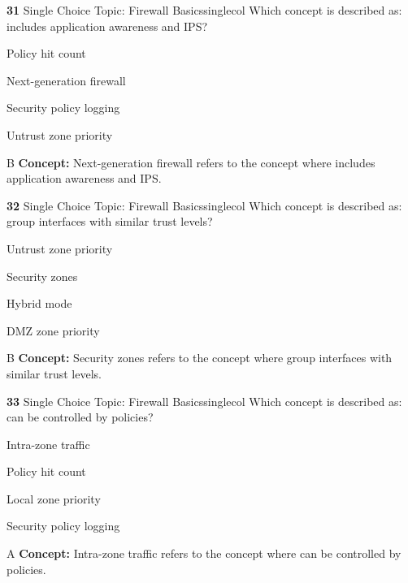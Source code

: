 \documentclass[10pt,a4paper]{article}
\begin{document}
\begin{qcard}{\color{white}\textbf{31} \hfill \small Single Choice \textbar{} Topic: Firewall Basics}{singlecol}
Which concept is described as: includes application awareness and IPS?

\begin{qoptions}
\item Policy hit count
\item Next-generation firewall
\item Security policy logging
\item Untrust zone priority
\end{qoptions}
\begin{explainbox}{B}
\textbf{Concept:} Next-generation firewall refers to the concept where includes application awareness and IPS.
\end{explainbox}
\end{qcard}

\begin{qcard}{\color{white}\textbf{32} \hfill \small Single Choice \textbar{} Topic: Firewall Basics}{singlecol}
Which concept is described as: group interfaces with similar trust levels?

\begin{qoptions}
\item Untrust zone priority
\item Security zones
\item Hybrid mode
\item DMZ zone priority
\end{qoptions}
\begin{explainbox}{B}
\textbf{Concept:} Security zones refers to the concept where group interfaces with similar trust levels.
\end{explainbox}
\end{qcard}

\begin{qcard}{\color{white}\textbf{33} \hfill \small Single Choice \textbar{} Topic: Firewall Basics}{singlecol}
Which concept is described as: can be controlled by policies?

\begin{qoptions}
\item Intra-zone traffic
\item Policy hit count
\item Local zone priority
\item Security policy logging
\end{qoptions}
\begin{explainbox}{A}
\textbf{Concept:} Intra-zone traffic refers to the concept where can be controlled by policies.
\end{explainbox}
\end{qcard}
\end{document}
